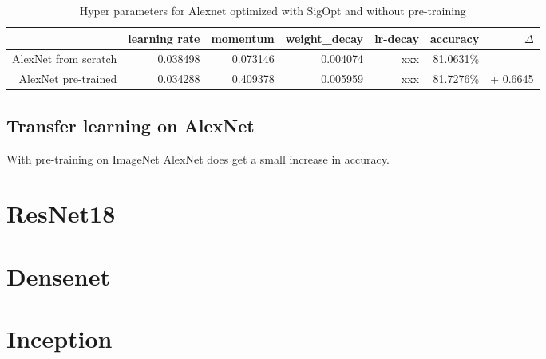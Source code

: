 \begin{table}[t] \centering
{}
\caption{Hyper parameters for Alexnet optimized with SigOpt and without pre-training}
\begin{tabular}{@{}rrrrrrr@{}}
\toprule & learning rate & momentum & weight\_decay & lr-decay & accuracy & $\Delta$ \\
\midrule
AlexNet	 from scratch	& 0.038498 & 0.073146 &  0.004074 & xxx & 81.0631\%  &		 \\
AlexNet	 pre-trained	& 0.034288 & 0.409378 &  0.005959 & xxx & 81.7276\%  & + 0.6645\\
\bottomrule
\end{tabular}
\label{tbl:AlexNetBaseline}
\end{table}


\subsection{Transfer learning on AlexNet}

With pre-training on ImageNet AlexNet does get a small increase in accuracy. 


\section{ResNet18}

\section{Densenet}

\section{Inception}


